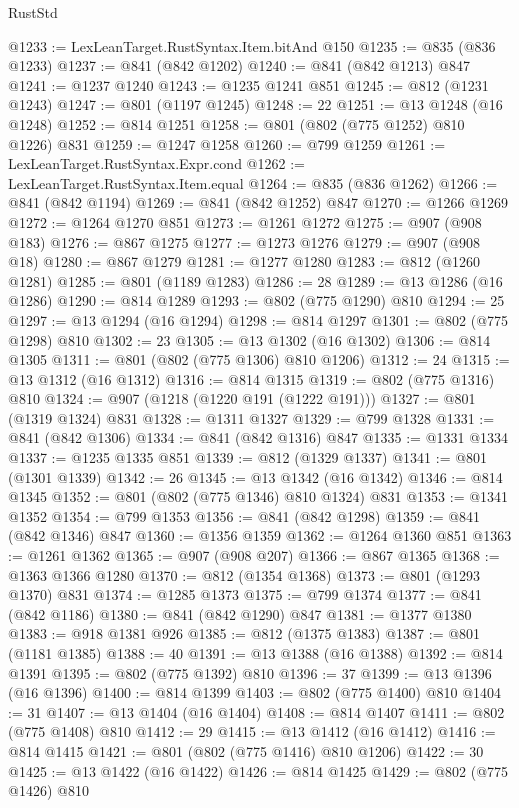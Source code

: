 \begin{lexlean}{RustStd}
\begin{coremodule}
{\begin{coremodule}
{{{{{@1233 := LexLeanTarget.RustSyntax.Item.bitAnd @150
@1235 := @835 (@836 @1233)
@1237 := @841 (@842 @1202)
@1240 := @841 (@842 @1213) @847
@1241 := @1237 @1240
@1243 := @1235 @1241 @851
@1245 := @812 (@1231 @1243)
@1247 := @801 (@1197 @1245)
@1248 := 22
@1251 := @13 @1248 (@16 @1248)
@1252 := @814 @1251
@1258 := @801 (@802 (@775 @1252) @810 @1226) @831
@1259 := @1247 @1258
@1260 := @799 @1259
@1261 := LexLeanTarget.RustSyntax.Expr.cond
@1262 := LexLeanTarget.RustSyntax.Item.equal
@1264 := @835 (@836 @1262)
@1266 := @841 (@842 @1194)
@1269 := @841 (@842 @1252) @847
@1270 := @1266 @1269
@1272 := @1264 @1270 @851
@1273 := @1261 @1272
@1275 := @907 (@908 @183)
@1276 := @867 @1275
@1277 := @1273 @1276
@1279 := @907 (@908 @18)
@1280 := @867 @1279
@1281 := @1277 @1280
@1283 := @812 (@1260 @1281)
@1285 := @801 (@1189 @1283)
@1286 := 28
@1289 := @13 @1286 (@16 @1286)
@1290 := @814 @1289
@1293 := @802 (@775 @1290) @810
@1294 := 25
@1297 := @13 @1294 (@16 @1294)
@1298 := @814 @1297
@1301 := @802 (@775 @1298) @810
@1302 := 23
@1305 := @13 @1302 (@16 @1302)
@1306 := @814 @1305
@1311 := @801 (@802 (@775 @1306) @810 @1206)
@1312 := 24
@1315 := @13 @1312 (@16 @1312)
@1316 := @814 @1315
@1319 := @802 (@775 @1316) @810
@1324 := @907 (@1218 (@1220 @191 (@1222 @191)))
@1327 := @801 (@1319 @1324) @831
@1328 := @1311 @1327
@1329 := @799 @1328
@1331 := @841 (@842 @1306)
@1334 := @841 (@842 @1316) @847
@1335 := @1331 @1334
@1337 := @1235 @1335 @851
@1339 := @812 (@1329 @1337)
@1341 := @801 (@1301 @1339)
@1342 := 26
@1345 := @13 @1342 (@16 @1342)
@1346 := @814 @1345
@1352 := @801 (@802 (@775 @1346) @810 @1324) @831
@1353 := @1341 @1352
@1354 := @799 @1353
@1356 := @841 (@842 @1298)
@1359 := @841 (@842 @1346) @847
@1360 := @1356 @1359
@1362 := @1264 @1360 @851
@1363 := @1261 @1362
@1365 := @907 (@908 @207)
@1366 := @867 @1365
@1368 := @1363 @1366 @1280
@1370 := @812 (@1354 @1368)
@1373 := @801 (@1293 @1370) @831
@1374 := @1285 @1373
@1375 := @799 @1374
@1377 := @841 (@842 @1186)
@1380 := @841 (@842 @1290) @847
@1381 := @1377 @1380
@1383 := @918 @1381 @926
@1385 := @812 (@1375 @1383)
@1387 := @801 (@1181 @1385)
@1388 := 40
@1391 := @13 @1388 (@16 @1388)
@1392 := @814 @1391
@1395 := @802 (@775 @1392) @810
@1396 := 37
@1399 := @13 @1396 (@16 @1396)
@1400 := @814 @1399
@1403 := @802 (@775 @1400) @810
@1404 := 31
@1407 := @13 @1404 (@16 @1404)
@1408 := @814 @1407
@1411 := @802 (@775 @1408) @810
@1412 := 29
@1415 := @13 @1412 (@16 @1412)
@1416 := @814 @1415
@1421 := @801 (@802 (@775 @1416) @810 @1206)
@1422 := 30
@1425 := @13 @1422 (@16 @1422)
@1426 := @814 @1425
@1429 := @802 (@775 @1426) @810
}}}}}
\end{coremodule}}
\end{coremodule}
\end{lexlean}
